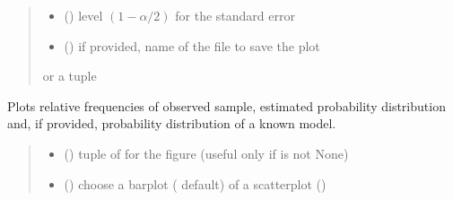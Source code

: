\documentclass[letterpaper,10pt,english]{sphinxmanual}
\begin{document}
\begin{fulllineitems}
\begin{fulllineitems}
\begin{quote}
\begin{description}
\begin{itemize}
\item {} 
\sphinxAtStartPar
{} () \textendash{} level \((1-\alpha/2)\) for the standard error

\item {} 
\sphinxAtStartPar
{} () \textendash{} if provided, name of the file to save the plot

\end{itemize}

\sphinxAtStartPar
{} or a tuple 

\end{description}\end{quote}

\end{fulllineitems}


\begin{fulllineitems}
\label{\detokenize{cubmods:cubmods.cush2.CUBresCUSH2.plot_ordinal}}
\pysigstartsignatures
{}
\pysigstopsignatures
\sphinxAtStartPar
Plots relative frequencies of observed sample, estimated probability distribution and,
if provided, probability distribution of a known model.
\begin{quote}\begin{description}
\begin{itemize}
\item {} 
\sphinxAtStartPar
{} () \textendash{} tuple of  for the figure (useful only if  is not None)

\item {} 
\sphinxAtStartPar
{} () \textendash{} choose a barplot ( default) of a scatterplot ()


\end{itemize}
\end{description}
\end{quote}
\end{fulllineitems}
\end{fulllineitems}
\end{document}
